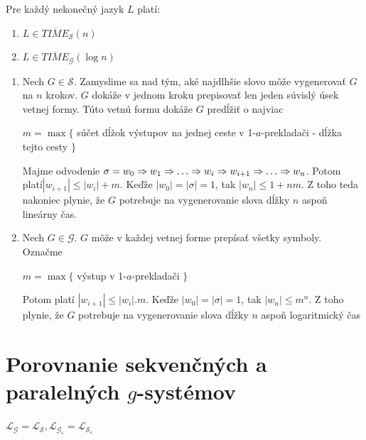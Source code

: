 \begin{veta}
  Pre každý nekonečný jazyk $L$ platí:
  \begin{enumerate}
    \item $L\in\overline{TIME}_{\mathcal{S}}(n)$
    \item $L\in\overline{TIME}_{\mathcal{G}}(\log n)$
  \end{enumerate}
\end{veta}

\begin{dokaz}
  \begin{enumerate}
    \item Nech $G\in\mathcal{S}$. Zamyslime sa nad tým, aké najdlhšie
    slovo môže vygenerovať $G$ na $n$ krokov. $G$ dokáže v jednom
    kroku prepisovať len jeden súvislý úsek vetnej formy. Túto vetnú
    formu dokáže $G$ predĺžiť o najviac

    \centerline{$m=\max\{$ súčet dĺžok výstupov na jednej ceste v
    1-$a$-prekladači - dĺžka tejto cesty $\}$} Majme odvodenie $\sigma
    =w_0\Ra w_1\Ra\dots\Ra w_i\Ra w_{i+1}\Ra\dots\Ra w_n$. Potom
    platí\linebreak $|w_{i+1}|\leq |w_i| + m$. Keďže $|w_0|=|\sigma
    |=1$, tak $|w_n|\leq 1 + nm$. Z toho teda nakoniec plynie, že $G$
    potrebuje na vygenerovanie slova dĺžky $n$ aspoň lineárny čas.
    \item Nech $G\in\mathcal{G}$. $G$ môže v každej vetnej forme
    prepísať všetky symboly. Označme

    \centerline{$m=\max\{$ výstup v 1-$a$-prekladači $\}$} Potom platí
    $|w_{i+1}|\leq |w_i|.m$. Keďže $|w_0|=|\sigma |=1$, tak $|w_n|\leq
    m^n$. Z toho plynie, že $G$ potrebuje na vygenerovanie slova dĺžky
    $n$ aspoň logaritmický čas
  \end{enumerate}
\end{dokaz}

\section{Porovnanie sekvenčných a paralelných $g$-systémov}
\label{gs_sec_sekvspar}

\begin{veta}
  \label{gs_veta_parsek}
  $\mathcal{L_G=L_S,L_{G_{\varepsilon}}=L_{S_{\varepsilon}}}$
\end{veta}

